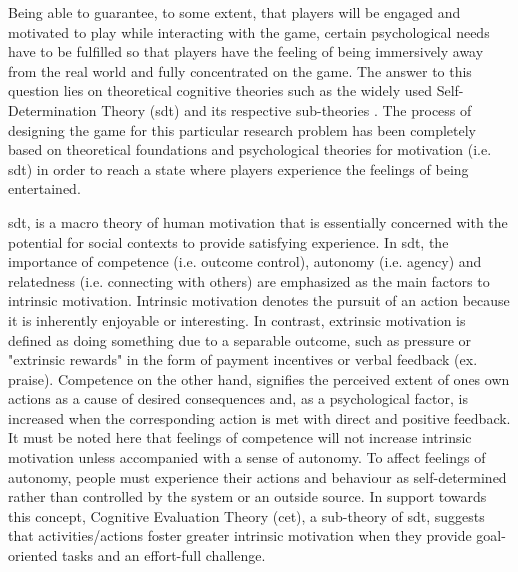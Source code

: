 Being able to guarantee, to some extent, that players will be engaged and motivated to play while interacting with the game, certain psychological needs have to be fulfilled so that players have the feeling of being immersively away from the real world and fully concentrated on the game. The answer to this question lies on theoretical cognitive theories such as the widely used Self-Determination Theory (\ac{sdt}) and its respective sub-theories \cite{std_and_games}. The process of designing the game for this particular research problem has been completely based on theoretical foundations and psychological theories for motivation (i.e. \ac{sdt}) in order to reach a state where players experience the feelings of being entertained. 

\ac{sdt}, is a macro theory of human motivation that is essentially concerned with the potential for social contexts to provide satisfying experience. In \ac{sdt}, the importance of competence (i.e. outcome control), autonomy (i.e. agency) and relatedness (i.e. connecting with others) are emphasized as the main factors to intrinsic motivation. Intrinsic motivation denotes the pursuit of an action because it is inherently enjoyable or interesting. In contrast, extrinsic motivation is defined as doing something due to a separable outcome, such as pressure or "extrinsic rewards" in the form of payment incentives or verbal feedback (ex. praise). Competence on the other hand, signifies the perceived extent of ones own actions as a cause of desired consequences and, as a psychological factor, is increased when the corresponding action is met with direct and positive feedback. It must be noted here that feelings of competence will not increase intrinsic motivation unless accompanied with a sense of autonomy. To affect feelings of autonomy, people must experience their actions and behaviour as self-determined rather than controlled by the system or an outside source. In support towards this concept, Cognitive Evaluation Theory (\ac{cet}), a sub-theory of \ac{sdt}, suggests that activities/actions foster greater intrinsic motivation when they provide goal-oriented tasks and an effort-full challenge. \cite{43, 49,std_and_games}